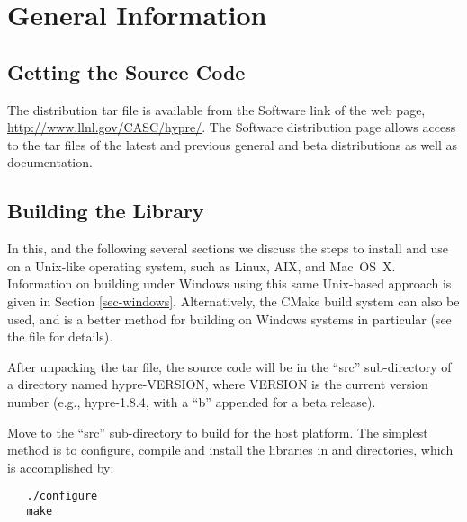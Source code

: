 
\chapter{General Information}


\section{Getting the Source Code}

The \hypre{} distribution tar file is available from the Software link of the
\hypre{} web page, \url{http://www.llnl.gov/CASC/hypre/}.  The \hypre{} Software
distribution page allows access to the tar files of the latest and previous
general and beta distributions as well as documentation.


\section{Building the Library}

In this, and the following several sections we discuss the steps to install and
use \hypre{} on a Unix-like operating system, such as Linux, AIX, and
Mac~OS~X. Information on building \hypre{} under Windows using this same
Unix-based approach is given in Section \ref{sec-windows}.  Alternatively, the
CMake build system \cite{CMakeWebPage} can also be used, and is a better method
for building \hypre{} on Windows systems in particular (see the 
file for details).

After unpacking the \hypre{} tar file, the source code will be in the ``src''
sub-directory of a directory named hypre-VERSION, where VERSION is the current
version number (e.g., hypre-1.8.4, with a ``b'' appended for a beta release).

Move to the ``src'' sub-directory to build \hypre{} for the host platform.  The
simplest method is to configure, compile and install the libraries in
 and  directories, which is accomplished
by:
\begin{verbatim}
   ./configure
   make
\end{verbatim}

